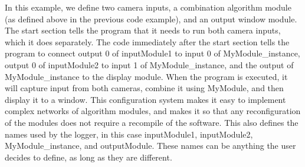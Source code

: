 \documentclass[letterpaper,10pt,titlepage]{IEEEtran}
\begin{document}
   In this example, we define two camera inputs, a combination algorithm module (as defined above in the previous code example), and an output window module. The start section tells the program that it needs to run both camera inputs, which it does separately. The code immediately after the start section tells the program to connect output 0 of inputModule1 to input 0 of MyModule\_instance, output 0 of inputModule2 to input 1 of MyModule\_instance, and the output of MyModule\_instance to the display module. When the program is executed, it will capture input from both cameras, combine it using MyModule, and then display it to a window. This configuration system makes it easy to implement complex networks of algorithm modules, and makes it so that any reconfiguration of the modules does not require a recompile of the software. This also defines the names used by the logger, in this case inputModule1, inputModule2, MyModule\_instance, and outputModule. These names can be anything the user decides to define, as long as they are different.
				
   
\end{document}
